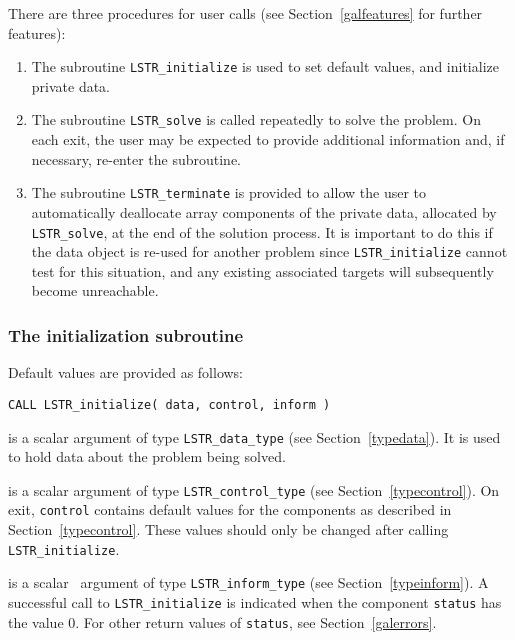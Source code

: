 \documentclass{galahad}
\newcommand{\packagename}{LS\-TR}
\begin{document}
\galarguments
There are three procedures for user calls
(see Section~\ref{galfeatures} for further features): 

\begin{enumerate}
\item The subroutine 
      {\tt \packagename\_initialize} 
      is used to set default values, and initialize private data.
\item The subroutine 
      {\tt \packagename\_solve} 
      is called repeatedly to solve the problem. 
      On each exit, the user may be expected to provide additional 
      information and, if necessary, re-enter the subroutine. 
\item The subroutine 
      {\tt \packagename\_terminate} 
      is provided to allow the user to automatically deallocate array 
       components of the private data, allocated by 
       {\tt \packagename\_solve}, 
       at the end of the solution process. 
       It is important to do this if the data object is re-used for another  
       problem since {\tt \packagename\_initialize} cannot test for this 
       situation,  
       and any existing associated targets will subsequently become 
       unreachable. 
\end{enumerate}


\subsubsection{The initialization subroutine}\label{subinit}
 Default values are provided as follows:

\hskip0.5in 
{\tt CALL \packagename\_initialize( data, control, inform )}

\begin{description}

 is a scalar \intentinout argument of type 
{\tt \packagename\_data\_type}
(see Section~\ref{typedata}). It is used to hold data about the problem being 
solved.

 is a scalar \intentout argument of type 
{\tt \packagename\_control\_type}
(see Section~\ref{typecontrol}). 
On exit, {\tt control} contains default values for the components as
described in Section~\ref{typecontrol}.
These values should only be changed after calling 
{\tt \packagename\_initialize}.

 is a scalar \intentout\ argument of type 
{\tt \packagename\_inform\_type}
(see Section~\ref{typeinform}). A successful call to
{\tt \packagename\_initialize}
is indicated when the  component {\tt status} has the value 0. 
For other return values of {\tt status}, see Section~\ref{galerrors}.

\end{description}
\end{document}
